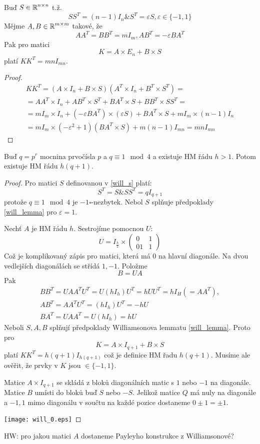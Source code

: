 \begin{lemma}[Williamson]\label{will_lemma}
    Buď $S\in\operatorname{\mathbb{R}}^{n\times n}$ t.ž.
    \[ SS^T=(n-1)I_n \& S^T=\varepsilon S, \varepsilon\in \{-1,1\} \]
    Mějme $A,B\in\operatorname{\mathbb{R}}^{m\times m}$ takové, že
    \[ AA^T=BB^T=mI_m, AB^T=-\varepsilon BA^T \]
    Pak pro matici
    \[ K=A\times E_n + B\times S \]
    platí $KK^T=mnI_{mn}$.
\end{lemma}
\begin{proof}
	\begin{gather*}
		KK^T = (A \times I_n + B \times S)(A^T \times I_n + B^T \times S^T) = \\
		= AA^T \times I_n + AB^T \times S^T + BA^T \times S + BB^T \times SS^T = \\
		= m I_m \times I_n + (-\varepsilon BA^T) \times (\varepsilon S) + BA^T \times S + m I_m \times (n - 1)  I_n \\
		= m I_m \times (-\varepsilon^2 + 1)(BA^T \times S) + m(n - 1) I_{mn} = mn I_{mn}
	\end{gather*}
\end{proof}
\begin{theorem}
    Buď $q=p^r$ mocnina prvočísla $p$ a $q\equiv 1\mod 4$ a existuje HM řádu $h>1$.
    Potom existuje HM řádu $h(q+1)$.
\end{theorem}
\begin{proof}
	Pro matici $S$ definovanou v \eqref{will_s} platí:
	\[ S^T = S \& SS^T = q I_{q + 1} \]
	protože $q \equiv 1 \mod4$ je $-1 \square$-nezbytek. Nebol $S$ splňuje předpoklady \cref{will_lemma} pro $\varepsilon = 1$.

	Nechť $A$ je HM řádu $h$.
	Sestrojíme pomocnou $U$:
	\[ U = I_{\frac{h}{2}} \times \begin{pmatrix} 0 & 1 \\ 01 & 1 \end{pmatrix} \]
	Což je komplikovaný zápis pro matici, která má 0 na hlavní diagonále.
	Na dvou vedlejších diagonálách se střídá $1, -1$.
	Položme
	\[ B = UA \]
	Pak
	\begin{gather*}
		BB^T = UAA^TU^T = U(hI_h)U^T = hUU^T = hI_H(= AA^T), \\
		AB^T = AA^TU^T = (hI_h)U^T = -hU\\
		BA^T = UAA^T = U(hI_h) = hU
	\end{gather*}
	Neboli $S, A, B$ splňují předpoklady Williamsonova lemmatu \cref{will_lemma}.
	Proto pro
	\[ K = A \times I_{q + 1} + B \times S \]
	platí $KK^T = h(q + 1)I_{h(q + 1)}$ což je definice HM řadu $h(q + 1)$.
	Musíme ale ověřit, že prvky v $K$ jsou $\in \{ -1, 1 \}$.

	Matice $A \times I_{q + 1}$ se skládá z bloků diagonálních matic s $1$ nebo $-1$ na diagonále.
	Matice $B$ umísti do bloků buď $S$ nebo $-S$.
	Jelikož matice $Q$ má nuly na diagonále a ${-1, 1}$ mimo diagonálu v součtu na každé pozice dostaneme $0 \pm 1 = \pm 1$.

	\texttt{[image: will\_0.eps]}
\end{proof}

HW: pro jakou matici $A$ dostaneme Payleyho konstrukce z Williamsonové?

